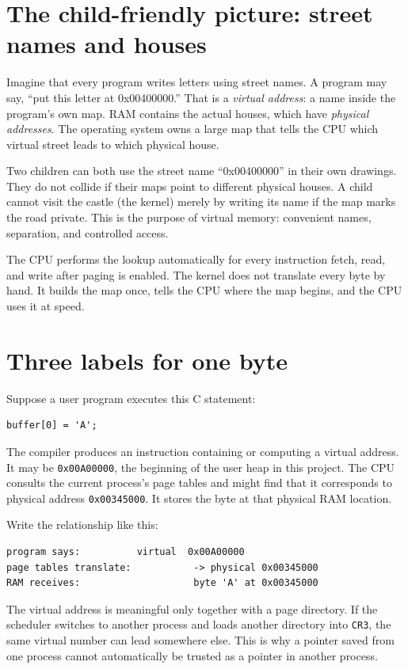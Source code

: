 \section{The child-friendly picture: street names and houses}
Imagine that every program writes letters using street names. A program may say, ``put this letter at 0x00400000.'' That is a \emph{virtual address}: a name inside the program's own map. RAM contains the actual houses, which have \emph{physical addresses}. The operating system owns a large map that tells the CPU which virtual street leads to which physical house.

Two children can both use the street name ``0x00400000'' in their own drawings. They do not collide if their maps point to different physical houses. A child cannot visit the castle (the kernel) merely by writing its name if the map marks the road private. This is the purpose of virtual memory: convenient names, separation, and controlled access.

The CPU performs the lookup automatically for every instruction fetch, read, and write after paging is enabled. The kernel does not translate every byte by hand. It builds the map once, tells the CPU where the map begins, and the CPU uses it at speed.

\section{Three labels for one byte}
Suppose a user program executes this C statement:
\begin{verbatim}
buffer[0] = 'A';
\end{verbatim}
The compiler produces an instruction containing or computing a virtual address. It may be \texttt{0x00A00000}, the beginning of the user heap in this project. The CPU consults the current process's page tables and might find that it corresponds to physical address \texttt{0x00345000}. It stores the byte at that physical RAM location.

Write the relationship like this:
\begin{verbatim}
program says:          virtual  0x00A00000
page tables translate:           -> physical 0x00345000
RAM receives:                    byte 'A' at 0x00345000
\end{verbatim}

The virtual address is meaningful only together with a page directory. If the scheduler switches to another process and loads another directory into \texttt{CR3}, the same virtual number can lead somewhere else. This is why a pointer saved from one process cannot automatically be trusted as a pointer in another process.

